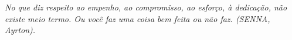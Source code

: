 
\renewcommand{\epigraphname}{EPÍGRAFE}

\begin{epigrafe}

\textit{No que diz respeito ao empenho, ao compromisso, ao esforço, à dedicação, não existe meio termo. Ou você faz uma coisa bem feita ou não faz. (SENNA, Ayrton).}

\end{epigrafe}

